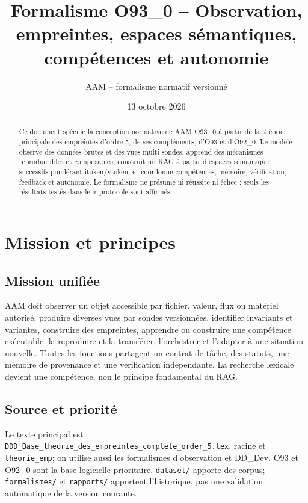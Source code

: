 \documentclass[11pt,a4paper]{report}
\title{Formalisme O93\_0 -- Observation, empreintes, espaces sémantiques, compétences et autonomie}\author{AAM -- formalisme normatif versionné}\date{13 octobre 2026}
\begin{document}
\maketitle
\begin{abstract}Ce document spécifie la conception normative de AAM O93\_0 à partir de la théorie principale des empreintes d'ordre 5, de ses compléments, d'O93 et d'O92\_0. Le modèle observe des données brutes et des vues multi-sondes, apprend des mécanismes reproductibles et composables, construit un RAG à partir d'espaces sémantiques successifs pondérant itoken/vtoken, et coordonne compétences, mémoire, vérification, feedback et autonomie. Le formalisme ne présume ni réussite ni échec : seuls les résultats testés dans leur protocole sont affirmés.\end{abstract}
\tableofcontents
\chapter{Mission et principes}
\section{Mission unifiée}AAM doit observer un objet accessible par fichier, valeur, flux ou matériel autorisé, produire diverses vues par sondes versionnées, identifier invariants et variantes, construire des empreintes, apprendre ou construire une compétence exécutable, la reproduire et la transférer, l'orchestrer et l'adapter à une situation nouvelle. Toutes les fonctions partagent un contrat de tâche, des statuts, une mémoire de provenance et une vérification indépendante. La recherche lexicale devient une compétence, non le principe fondamental du RAG.
\section{Source et priorité}Le texte principal est \texttt{DDD\_Base\_theorie\_des\_empreintes\_complete\_order\_5.tex}, racine et \texttt{theorie\_emp}; on utilise aussi les formalismes d'observation et DD\_Dev. O93 et O92\_0 sont la base logicielle prioritaire. \texttt{dataset/} apporte des corpus; \texttt{formalismes/} et \texttt{rapports/} apportent l'historique, pas une validation automatique de la version courante.
\end{document}
